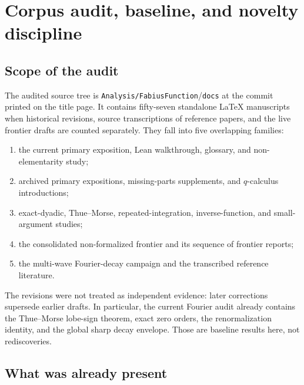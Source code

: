 \documentclass[11pt,oneside]{article}
\theoremstyle{definition}
\theoremstyle{remark}
\newcommand{\repo}{\nolinkurl{Analysis/FabiusFunction}}
\begin{document}
\tableofcontents
\newpage

\section{Corpus audit, baseline, and novelty discipline}

\subsection{Scope of the audit}

The audited source tree is \repo/\texttt{docs} at the commit printed on the
title page.  It contains fifty-seven standalone \LaTeX{} manuscripts when
historical revisions, source transcriptions of reference papers, and the live
frontier drafts are counted separately.  They fall into five overlapping
families:
\begin{enumerate}
\item the current primary exposition, Lean walkthrough, glossary, and
      non-elementarity study;
\item archived primary expositions, missing-parts supplements, and
      $q$-calculus introductions;
\item exact-dyadic, Thue--Morse, repeated-integration, inverse-function, and
      small-argument studies;
\item the consolidated non-formalized frontier and its sequence of frontier
      reports;
\item the multi-wave Fourier-decay campaign and the transcribed reference
      literature.
\end{enumerate}
The revisions were not treated as independent evidence: later corrections
supersede earlier drafts.  In particular, the current Fourier audit already
contains the Thue--Morse lobe-sign theorem, exact zero orders, the
renormalization identity, and the global sharp decay envelope.  Those are
baseline results here, not rediscoveries.

\subsection{What was already present}
\end{document}
